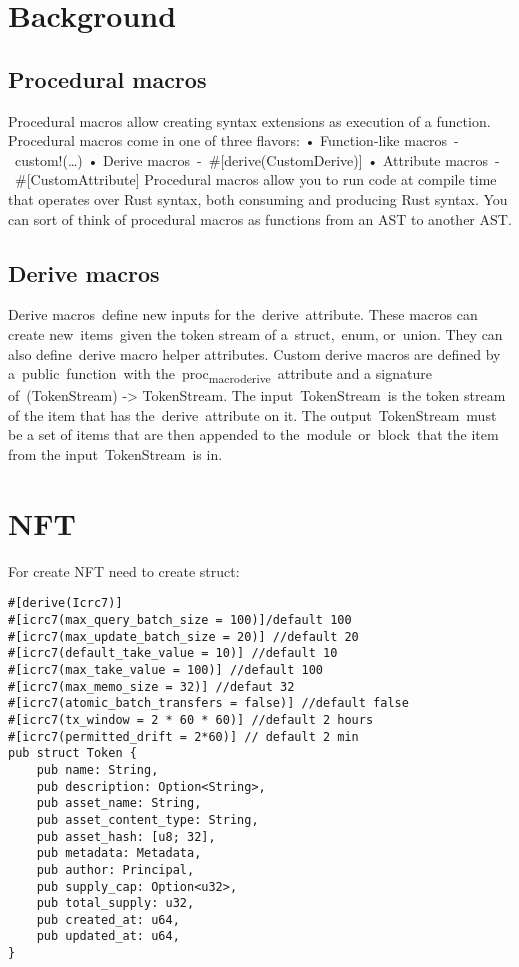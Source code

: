 \documentclass[11pt]{article}
\author{andrey}
\date{\today}
\title{}
\begin{document}
\tableofcontents

\section{Background}
\label{sec:org2e2cf98}
\subsection{Procedural macros}
\label{sec:org2862315}
Procedural macros allow creating syntax extensions as execution of a function. Procedural macros come in one of three flavors:
    • Function-like macros - custom!(\ldots{})
    • Derive macros - \#[derive(CustomDerive)]
    • Attribute macros - \#[CustomAttribute]
Procedural macros allow you to run code at compile time that operates over Rust syntax, both consuming and producing Rust syntax. You can sort of think of procedural macros as functions from an AST to another AST.

\subsection{Derive macros}
\label{sec:org971bc85}
Derive macros define new inputs for the derive attribute. These macros can create new items given the token stream of a struct, enum, or union. They can also define derive macro helper attributes.
Custom derive macros are defined by a public function with the proc\textsubscript{macro}\textsubscript{derive} attribute and a signature of (TokenStream) -> TokenStream.
The input TokenStream is the token stream of the item that has the derive attribute on it. The output TokenStream must be a set of items that are then appended to the module or block that the item from the input TokenStream is in.

\section{NFT}
\label{sec:org98a9046}
For create NFT need to create struct:

\begin{verbatim}
#[derive(Icrc7)]
#[icrc7(max_query_batch_size = 100)]/default 100
#[icrc7(max_update_batch_size = 20)] //default 20
#[icrc7(default_take_value = 10)] //default 10
#[icrc7(max_take_value = 100)] //default 100
#[icrc7(max_memo_size = 32)] //defaut 32
#[icrc7(atomic_batch_transfers = false)] //default false
#[icrc7(tx_window = 2 * 60 * 60)] //default 2 hours
#[icrc7(permitted_drift = 2*60)] // default 2 min
pub struct Token {
    pub name: String,
    pub description: Option<String>,
    pub asset_name: String,
    pub asset_content_type: String,
    pub asset_hash: [u8; 32],
    pub metadata: Metadata,
    pub author: Principal,
    pub supply_cap: Option<u32>,
    pub total_supply: u32,
    pub created_at: u64,
    pub updated_at: u64,
}
\end{verbatim}
\end{document}

